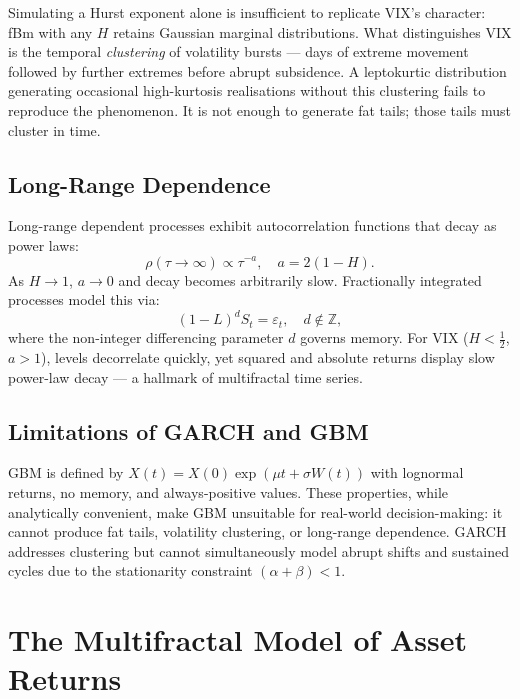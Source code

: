 \documentclass[12pt,a4paper]{article}
\begin{document}
Simulating a Hurst exponent alone is insufficient to replicate VIX's
character: fBm with any $H$ retains Gaussian marginal distributions.
What distinguishes VIX is the temporal \emph{clustering} of volatility
bursts --- days of extreme movement followed by further extremes before
abrupt subsidence. A leptokurtic distribution generating occasional
high-kurtosis realisations without this clustering fails to reproduce
the phenomenon. It is not enough to generate fat tails; those tails
must cluster in time.

\subsection{Long-Range Dependence}

Long-range dependent processes exhibit autocorrelation functions that
decay as power laws:
\begin{equation}
  \rho(\tau \to \infty) \propto \tau^{-a}, \quad a = 2(1-H).
  \label{eq:acf-power}
\end{equation}
As $H \to 1$, $a \to 0$ and decay becomes arbitrarily slow.
Fractionally integrated processes \citep{robinson2003} model this via:
\begin{equation}
  (1 - L)^d S_t = \varepsilon_t, \quad d \notin \mathbb{Z},
  \label{eq:arfima}
\end{equation}
where the non-integer differencing parameter $d$ governs memory.
For VIX ($H < \tfrac{1}{2}$, $a > 1$), levels decorrelate quickly,
yet squared and absolute returns display slow power-law decay --- a
hallmark of multifractal time series.

\subsection{Limitations of GARCH and GBM}

GBM is defined by $X(t) = X(0)\exp(\mu t + \sigma W(t))$ with
lognormal returns, no memory, and always-positive values. These
properties, while analytically convenient, make GBM unsuitable for
real-world decision-making: it cannot produce fat tails, volatility
clustering, or long-range dependence. GARCH addresses clustering but
cannot simultaneously model abrupt shifts and sustained cycles due to
the stationarity constraint $(\alpha + \beta) < 1$.

\section{The Multifractal Model of Asset Returns}
\end{document}
